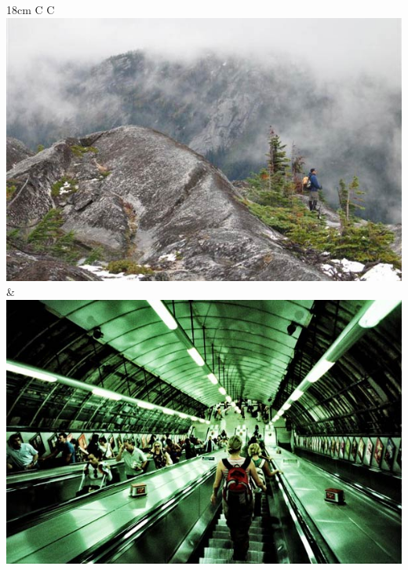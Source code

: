 	\begin{table}[H]
  		\begin{adjustwidth}{-1.5cm}{1.5cm}
		\centering
		\begin{tabulary}{18cm}{ C C }
			\includegraphics[scale=0.4]{bilder/hiking.jpg} & \includegraphics[scale=0.4]{bilder/tube.jpg}\\
		\end{tabulary}
  		\end{adjustwidth}
	\end{table}

